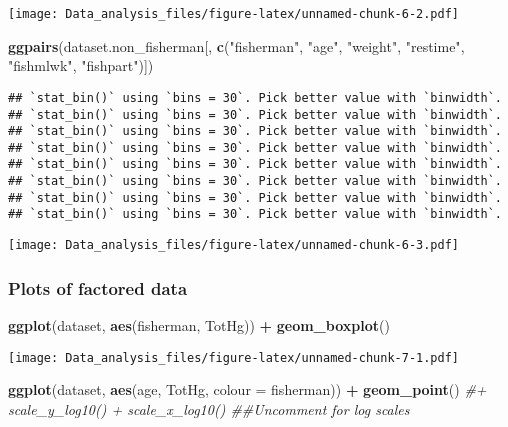 \documentclass[12pt,]{article}
\newenvironment{Shaded}{\begin{snugshade}}{\end{snugshade}}
\newcommand{\KeywordTok}[1]{\textcolor[rgb]{0.13,0.29,0.53}{\textbf{#1}}}
\newcommand{\DataTypeTok}[1]{\textcolor[rgb]{0.13,0.29,0.53}{#1}}
\newcommand{\StringTok}[1]{\textcolor[rgb]{0.31,0.60,0.02}{#1}}
\newcommand{\CommentTok}[1]{\textcolor[rgb]{0.56,0.35,0.01}{\textit{#1}}}
\newcommand{\OperatorTok}[1]{\textcolor[rgb]{0.81,0.36,0.00}{\textbf{#1}}}
\newcommand{\NormalTok}[1]{#1}
\begin{document}
\texttt{[image: Data\_analysis\_files/figure-latex/unnamed-chunk-6-2.pdf]}

\begin{Shaded}
\begin{Highlighting}[]
\KeywordTok{ggpairs}\NormalTok{(dataset.non_fisherman[, }\KeywordTok{c}\NormalTok{(}\StringTok{"fisherman"}\NormalTok{, }\StringTok{"age"}\NormalTok{, }\StringTok{"weight"}\NormalTok{, }\StringTok{"restime"}\NormalTok{, }\StringTok{"fishmlwk"}\NormalTok{, }\StringTok{"fishpart"}\NormalTok{)])}
\end{Highlighting}
\end{Shaded}

\begin{verbatim}
## `stat_bin()` using `bins = 30`. Pick better value with `binwidth`.
## `stat_bin()` using `bins = 30`. Pick better value with `binwidth`.
## `stat_bin()` using `bins = 30`. Pick better value with `binwidth`.
## `stat_bin()` using `bins = 30`. Pick better value with `binwidth`.
## `stat_bin()` using `bins = 30`. Pick better value with `binwidth`.
## `stat_bin()` using `bins = 30`. Pick better value with `binwidth`.
## `stat_bin()` using `bins = 30`. Pick better value with `binwidth`.
## `stat_bin()` using `bins = 30`. Pick better value with `binwidth`.
\end{verbatim}

\texttt{[image: Data\_analysis\_files/figure-latex/unnamed-chunk-6-3.pdf]}

\subsubsection{Plots of factored data}\label{plots-of-factored-data}

\begin{Shaded}
\begin{Highlighting}[]
\KeywordTok{ggplot}\NormalTok{(dataset, }\KeywordTok{aes}\NormalTok{(fisherman, TotHg)) }\OperatorTok{+}\StringTok{ }\KeywordTok{geom_boxplot}\NormalTok{()}
\end{Highlighting}
\end{Shaded}

\texttt{[image: Data\_analysis\_files/figure-latex/unnamed-chunk-7-1.pdf]}

\begin{Shaded}
\begin{Highlighting}[]
\KeywordTok{ggplot}\NormalTok{(dataset, }\KeywordTok{aes}\NormalTok{(age, TotHg, }\DataTypeTok{colour =}\NormalTok{ fisherman)) }\OperatorTok{+}\StringTok{ }\KeywordTok{geom_point}\NormalTok{() }\CommentTok{#+ scale_y_log10() + scale_x_log10() ##Uncomment for log scales}
\end{Highlighting}
\end{Shaded}
\end{document}
